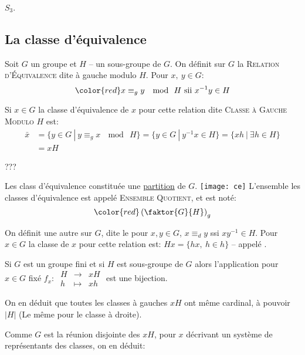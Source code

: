 \begin{examplebox}
	$S_3$.
\end{examplebox}

\subsection{La classe d'équivalence} 

\begin{definition}
	Soit $G$ un groupe et $H$ -- un sous-groupe de $G$. On définit sur $G$ la \textsc{Relation d'Équivalence} dite à gauche modulo $H$. Pour $x,\ y\in G$: 
	\[ \color{red} x\equiv_g y\ \mod\ H \mbox{ sii } x^{-1}y\in H \]
	\vspace{-8mm}
\end{definition}

Si $x\in G$ la classe d'équivalence de $x$ pour cette relation dite \textsc{Classe à Gauche Modulo $H$} est:
\begin{align*}	
	\bar{x} & =\{y\in G\ |\ y\equiv_g x\  \mod\ H\}=\{y\in G\ |\ y^{-1}x\in H\}=\{x h\ |\ \exists h\in H\}\\
	& =xH
\end{align*} 

	???

\begin{remark}
	Les class d'équivalence constituée une \underline{partition} de $G$.
	\texttt{[image: ce]}
	L'ensemble les classes d'équivalence est appelé \textsc{Ensemble Quotient}, et est noté:
	$$ \color{red}\left(	\faktor{G}{H}	\right)_g$$
\end{remark}

On définit une autre  sur $G$, dite  le pour $x, y\in G$, $x\equiv_dy$ ssi $xy^{-1}\in H$. Pour $x\in G$ la classe de $x$ pour cette relation est: $Hx=\{hx,\ h\in h\}$ -- appelé .

Si $G$ est un groupe fini et si $H$ est sous-groupe de $G$ alors l'application pour $x\in G$ fixé $f_x:\ \begin{array}{rcl}H &\rightarrow & xH\\ h &\mapsto & xh\end{array}$ est une bijection.

On en déduit que toutes les classes à gauches $xH$ ont même cardinal, à pouvoir $|H|$ (Le même pour le classe à droite).

Comme $G$ est la réunion disjointe des $xH$, pour $x$ décrivant un système de représentants des classes, on en déduit:

